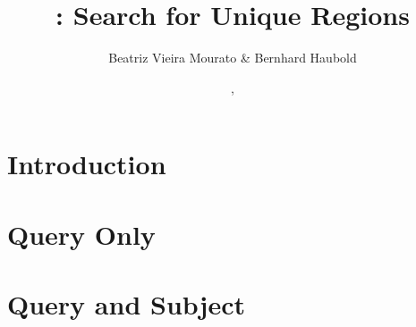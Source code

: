 \documentclass[a4paper]{report}
\begin{document}
\pagestyle{noweb}

\title{: Search for Unique Regions}
\author{Beatriz Vieira Mourato \& Bernhard Haubold}
\date{\!\!, }
\maketitle

\tableofcontents

\chapter{Introduction}

\chapter{Query Only}\label{ch:q}


\chapter{Query and Subject}\label{ch:qs}




\end{document}
